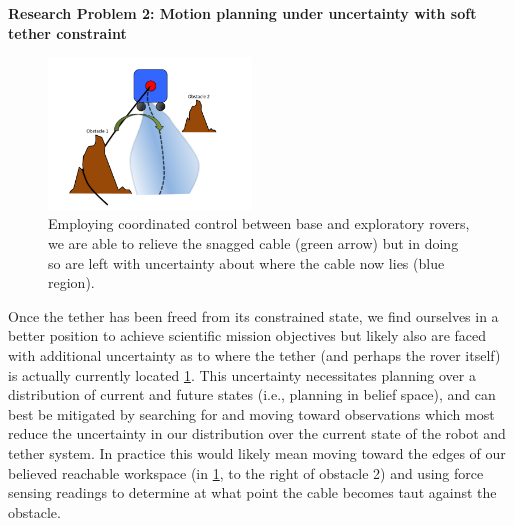 \documentclass[12pt]{article}
\begin{document}
{\bf Research Problem 2: Motion planning under uncertainty with soft tether constraint \\}
\begin{figure}
  \begin{center}
	\vspace{-0.5in}	
	\includegraphics[width=0.48\textwidth, left]{cable_uncertainty}
  \end{center}
  \vspace{-0.5in}
  \label{fig:cable}
  \caption{Employing coordinated control between base and exploratory rovers, we are able to relieve the snagged cable (green arrow) but in doing so are left with uncertainty about where the cable now lies (blue region).}
\end{figure}
\vspace{-0.15in}

Once the tether has been freed from its constrained state, we find ourselves in a better position to achieve scientific mission objectives but likely also are faced with additional uncertainty as to where the tether (and perhaps the rover itself) is actually currently located \ref{fig:cable}. This uncertainty necessitates planning over a distribution of current and future states (i.e., planning in belief space), and can best be mitigated by searching for and moving toward observations which most reduce the uncertainty in our distribution over the current state of the robot and tether system. In practice this would likely mean moving toward the edges of our believed reachable workspace (in \ref{fig:cable}, to the right of obstacle 2) and using force sensing readings to determine at what point the cable becomes taut against the obstacle. 
\end{document}
